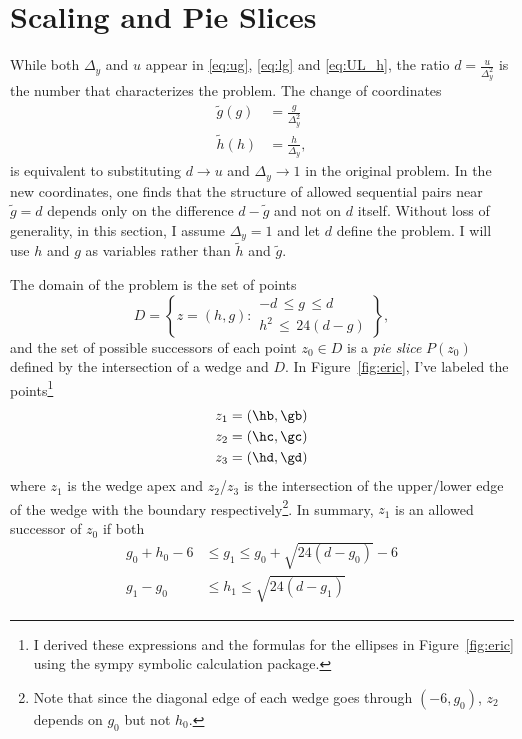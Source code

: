 \documentclass[twocolumn]{article}
\begin{document}
\section{Scaling and Pie Slices}
\label{sec:scaling}

While both $\Delta_y$ and $u$ appear in \eqref{eq:ug}, \eqref{eq:lg}
and \eqref{eq:UL_h}, the ratio $d = \frac{u}{\Delta_y^2}$ is the
number that characterizes the problem.  The change of coordinates
\begin{subequations}
  \label{eq:rescale}
  \begin{align}
    \tilde g(g) &= \frac{g}{\Delta_y^2} \\
    \tilde h(h) &= \frac{h}{\Delta_y},
  \end{align}
\end{subequations}
is equivalent to substituting $d \rightarrow u$ and
$\Delta_y \rightarrow 1$ in the original problem.  In the new
coordinates, one finds that the structure of allowed sequential pairs
near $\tilde g=d$ depends only on the difference $d-\tilde g$ and not
on $d$ itself.  Without loss of generality, in this section, I assume
$\Delta_y=1$ and let $d$ define the problem.  I will use $h$ and $g$
as variables rather than $\tilde h$ and $\tilde g$.

The domain of the problem is the set of points
\begin{equation}
  \label{eq:domain}
  D = \left\{ z = (h,g) :
    \begin{array}{l}
      -d \, \leq g \, \leq d \\
      h^2\, \leq \, 24(d-g)
    \end{array}
    \right\},
\end{equation}
and the set of possible successors of each point $z_0 \in D$ is a
\emph{pie slice} $P(z_0)$ defined by the intersection of a wedge and
$D$.  In Figure~\ref{fig:eric}, I've labeled the points\footnote{I
  derived these expressions and the formulas for the ellipses in
  Figure~\ref{fig:eric} using the sympy symbolic calculation package.}
\begin{align*}
  z_1 &= \left( \hb, \gb \right) \\
  z_2 &= \left( \hc, \gc \right) \\
  z_3 &= \left( \hd, \gd \right)
\end{align*}
where $z_1$ is the wedge apex and $z_2$/$z_3$ is the intersection of
the upper/lower edge of the wedge with the boundary
respectively\footnote{Note that since the diagonal edge of each wedge
  goes through $(-6,g_0)$, $z_2$ depends on $g_0$ but not $h_0$.}.  In
summary, $z_1$ is an allowed successor of $z_0$ if both
\begin{subequations}
  \label{eq:symallowed}
  \begin{align}
    g_0 + h_0 -6 &\leq g_1 \leq g_0 + \sqrt{24(d-g_0)} - 6 \\
    g_1 - g_0 &\leq h_1 \leq \sqrt{24(d-g_1)}
  \end{align}
\end{subequations}
\end{document}
